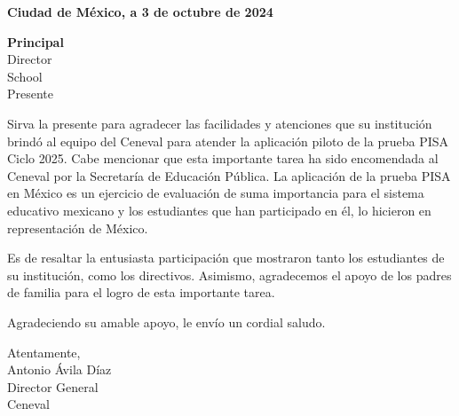 \documentclass[letterpaper]{letter}
\begin{document}
\large

\vspace*{.5cm}  %

\begin{flushright}    
    \textbf{Ciudad de México, a 3 de octubre de 2024}   
\end{flushright} 
\vspace{3\baselineskip}
\textbf{{{Principal}} } \\
Director \\ 
{{School}} \\
Presente 

Sirva la presente para agradecer las facilidades y atenciones que su institución brindó al equipo del Ceneval para atender la aplicación piloto de la prueba PISA Ciclo 2025. Cabe mencionar que esta importante tarea ha sido encomendada al Ceneval por la Secretaría de Educación Pública. La aplicación de la prueba PISA en México es un ejercicio de evaluación de suma importancia para el sistema educativo mexicano y los estudiantes que han participado en él, lo hicieron en representación de México.

Es de resaltar la entusiasta participación que mostraron tanto los estudiantes de su institución, como los directivos. Asimismo, agradecemos el apoyo de los padres de familia para el logro de esta importante tarea.

Agradeciendo su amable apoyo, le envío un cordial saludo. 

\vspace{1\baselineskip}
\begin{center}
    Atentamente, \\    
    \vspace{1\baselineskip}
    \vspace{1\baselineskip}
    Antonio Ávila Díaz \\ 
    Director General \\ 
    Ceneval \\    
\end{center}
\end{document}

